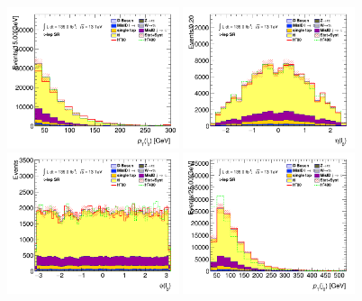 		\begin{figure}[!htp]
			\begin{center}    
			\includegraphics[width=0.45\textwidth]{chapters/chapter6_HPlus/images/taulep/lep_0_pt_SR_TAULEP.png}
			\includegraphics[width=0.45\textwidth]{chapters/chapter6_HPlus/images/taulep/lep_0_eta_SR_TAULEP.png} \\
			\includegraphics[width=0.45\textwidth]{chapters/chapter6_HPlus/images/taulep/lep_0_phi_SR_TAULEP.png}
			\includegraphics[width=0.45\textwidth]{chapters/chapter6_HPlus/images/taulep/jet_0_pt_SR_TAULEP.png} \\

\end{center}
\end{figure}
